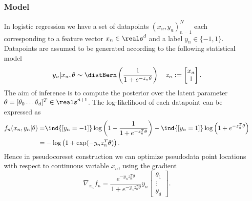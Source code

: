 \subsubsection{Model}
\label{supp:logreg_model_appendix}
In logistic regression we have a set of datapoints $(x_n, y_n)_{n=1}^{N}$ each corresponding to a feature vector ${x_n \in \reals^d}$ and a label ${y_n \in \{-1, 1\}}$. Datapoints are assumed to be generated according to the following statistical model
\[
y_n | x_n, \theta \sim \distBern \left( \frac{1}{1+e^{-z_n \theta}} \right) 
\quad 
z_n := \begin{bmatrix}
			x_n \\
			1
		\end{bmatrix}.
\label{eq:logreg-model}
\]
The aim of inference is to compute the posterior over the latent parameter $ \theta = [\theta_0 \ldots \theta_d]^T \in \reals^{d+1}$.
The log-likelihood of each datapoint can be expressed as
\[
\begin{split}
f_n(x_n, y_n|\theta)  
=&\ind{[y_n=-1]}\log \left( 1 - \frac{1}{1+e^{-z_n^T \theta}}\right) 
- \ind{[y_n=1]} \log \left( 1+ e^{-z_n^T \theta}  \right) \\
=&-\log\left( 1 + \exp(-y_n z_n^T\theta)\right).
\label{eq:logreg-loglik}
\end{split}
\]
Hence in pseudocoreset construction we can optimize pseudodata point locations with respect to continuous variable $ x_n$, using the gradient
\[
\nabla_{x_n}f_n =  \frac{e^{-y_n z_n^T \theta}}{1+e^{-y_n z_n^T \theta}}y_n \begin{bmatrix}
\theta_1 \\
\vdots \\
\theta_d
\end{bmatrix}.
\label{eq:logreg-loglik-locgrad}
\]



